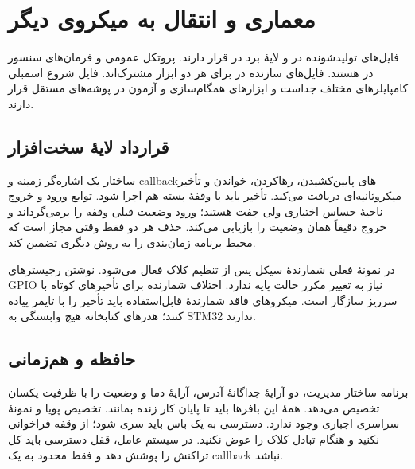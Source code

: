 \section{معماری و انتقال به میکروی دیگر}
فایل‌های تولیدشونده در
و لایهٔ برد در
قرار دارند. پروتکل عمومی و فرمان‌های سنسور در
هستند. فایل‌های سازنده در
برای هر دو ابزار مشترک‌اند.
\cite{cubef1}
 فایل شروع اسمبلی کامپایلرهای مختلف جداست و
ابزارهای همگام‌سازی و آزمون در پوشه‌های مستقل قرار دارند.

\subsection{قرارداد لایهٔ سخت‌افزار}
ساختار
یک اشاره‌گر زمینه و callbackهای پایین‌کشیدن، رهاکردن، خواندن و تأخیر
میکروثانیه‌ای دریافت می‌کند. تأخیر باید با وقفهٔ بسته هم اجرا شود. توابع ورود
و خروج ناحیهٔ حساس اختیاری ولی جفت هستند؛ ورود وضعیت قبلی وقفه را برمی‌گرداند
و خروج دقیقاً همان وضعیت را بازیابی می‌کند. حذف هر دو فقط وقتی مجاز است که
محیط برنامه زمان‌بندی را به روش دیگری تضمین کند.

در نمونهٔ فعلی شمارندهٔ سیکل
پس از تنظیم کلاک فعال می‌شود. نوشتن رجیسترهای GPIO نیاز به تغییر مکرر حالت
پایه ندارد. اختلاف شمارنده برای تأخیرهای کوتاه با سرریز سازگار است. میکروهای
فاقد شمارندهٔ قابل‌استفاده باید تأخیر را با تایمر پیاده کنند؛ هدرهای کتابخانه
هیچ وابستگی به STM32 ندارند.

\subsection{حافظه و هم‌زمانی}
برنامه ساختار مدیریت، دو آرایهٔ جداگانهٔ آدرس، آرایهٔ دما و وضعیت را با ظرفیت
یکسان تخصیص می‌دهد. همهٔ این بافرها باید تا پایان کار زنده بمانند. تخصیص پویا
و نمونهٔ سراسری اجباری وجود ندارد. دسترسی به یک باس باید سری شود؛ از وقفه
فراخوانی نکنید و هنگام تبادل کلاک را عوض نکنید. در سیستم عامل، قفل دسترسی باید
کل تراکنش را پوشش دهد و فقط محدود به یک callback نباشد.
